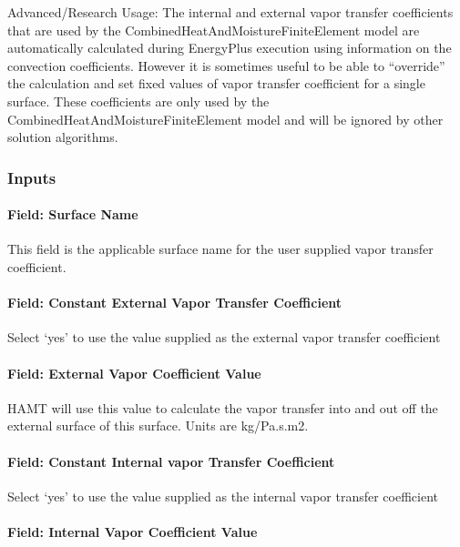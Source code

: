 Advanced/Research Usage: The internal and external vapor transfer coefficients that are used by the CombinedHeatAndMoistureFiniteElement model are automatically calculated during EnergyPlus execution using information on the convection coefficients. However it is sometimes useful to be able to ``override'' the calculation and set fixed values of vapor transfer coefficient for a single surface. These coefficients are only used by the CombinedHeatAndMoistureFiniteElement model and will be ignored by other solution algorithms.

\subsubsection{Inputs}\label{inputs-12}

\paragraph{Field: Surface Name}\label{field-surface-name-3}

This field is the applicable surface name for the user supplied vapor transfer coefficient.

\paragraph{Field: Constant External Vapor Transfer Coefficient}\label{field-constant-external-vapor-transfer-coefficient}

Select `yes' to use the value supplied as the external vapor transfer coefficient

\paragraph{Field: External Vapor Coefficient Value}\label{field-external-vapor-coefficient-value}

HAMT will use this value to calculate the vapor transfer into and out off the external surface of this surface. Units are kg/Pa.s.m2.

\paragraph{Field: Constant Internal vapor Transfer Coefficient}\label{field-constant-internal-vapor-transfer-coefficient}

Select `yes' to use the value supplied as the internal vapor transfer coefficient

\paragraph{Field: Internal Vapor Coefficient Value}\label{field-internal-vapor-coefficient-value}

